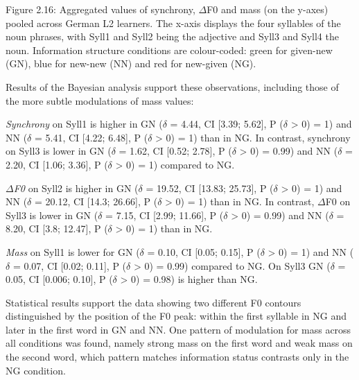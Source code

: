 \begin{stylecaption}
Figure 2.16: Aggregated values of synchrony, ${\Delta}$F0 and mass (on the y-axes) pooled across German L2 learners. The x-axis displays the four syllables of the noun phrases, with Syll1 and Syll2 being the adjective and Syll3 and Syll4 the noun. Information structure conditions are colour-coded: green for given-new (GN), blue for new-new (NN) and red for new-given (NG).
\end{stylecaption}

\begin{styleStandard}
Results of the Bayesian analysis support these observations, including those of the more subtle modulations of mass values:
\end{styleStandard}

\begin{listWWNumiiileveli}
\item 
\begin{stylelsBulletList}
\textit{Synchrony }on Syll1 is higher in GN ($\delta $ = 4.44, CI [3.39; 5.62], P ($\delta $ {\textgreater} 0) = 1) and NN ($\delta $ = 5.41, CI [4.22; 6.48], P ($\delta $ {\textgreater} 0) = 1) than in NG. In contrast, synchrony on Syll3 is lower in GN ($\delta $ = 1.62, CI [0.52; 2.78], P ($\delta $ {\textgreater} 0) = 0.99) and NN ($\delta $ = 2.20, CI [1.06; 3.36], P ($\delta $ {\textgreater} 0) = 1) compared to NG.
\end{stylelsBulletList}
\item 
\begin{stylelsBulletList}
\textit{${\Delta}$F0 }on Syll2 is higher in GN ($\delta $ = 19.52, CI [13.83; 25.73], P ($\delta $ {\textgreater} 0) = 1) and NN ($\delta $ = 20.12, CI [14.3; 26.66], P ($\delta $ {\textgreater} 0) = 1) than in NG. In contrast, ${\Delta}$F0 on Syll3 is lower in GN ($\delta $ = 7.15, CI [2.99; 11.66], P ($\delta $ {\textgreater} 0) = 0.99) and NN ($\delta $ = 8.20, CI [3.8; 12.47], P ($\delta $ {\textgreater} 0) = 1) than in NG.
\end{stylelsBulletList}
\item 
\begin{stylelsBulletList}
\textit{Mass} on Syll1 is lower for GN ($\delta $ = 0.10, CI [0.05; 0.15], P ($\delta $ {\textgreater} 0) = 1) and NN ($\delta $ = 0.07, CI [0.02; 0.11], P ($\delta $ {\textgreater} 0) = 0.99) compared to NG. On Syll3 GN ($\delta $ = 0.05, CI [0.006; 0.10], P ($\delta $ {\textgreater} 0) = 0.98) is higher than NG.
\end{stylelsBulletList}
\end{listWWNumiiileveli}
\begin{styleStandard}
Statistical results support the data showing two different F0 contours distinguished by the position of the F0 peak: within the first syllable in NG and later in the first word in GN and NN. One pattern of modulation for mass across all conditions was found, namely strong mass on the first word and weak mass on the second word, which pattern matches information status contrasts only in the NG condition.
\end{styleStandard}

